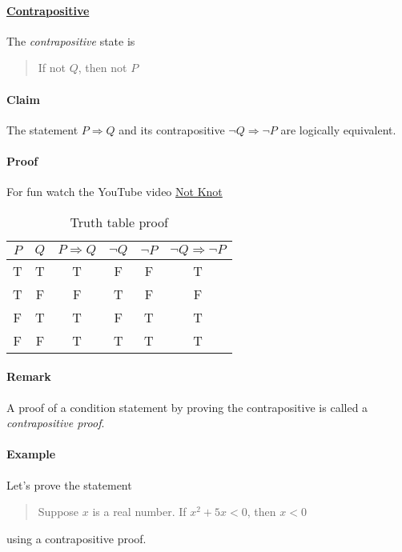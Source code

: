 \documentclass[../main.tex]{subfiles}
\begin{document}
\paragraph{\underline{Contrapositive}}

The \emph{contrapositive} state is

\begin{quote}
    If not $Q$, then not $P$
\end{quote}

\paragraph{Claim}

The statement $P \Rightarrow Q$ and its contrapositive $\neg Q \Rightarrow \neg P$ are logically 
equivalent.

\paragraph{Proof}

For fun watch the YouTube video \href{https://youtu.be/QcLfb0PhfO0?si=ngcYSId-1LFhW5fA}{Not Knot}

\begin{table*}[h]
    \centering
    \begin{tabular}{c|c|c|c|c|c}
        $P$ & $Q$ & $P \Rightarrow Q$ & $\neg Q$ & $\neg P$ & $\neg Q \Rightarrow \neg P$ \\
        \hline
        T & T & T & F & F & T \\
        T & F & F & T & F & F \\
        F & T & T & F & T & T \\
        F & F & T & T & T & T
    \end{tabular}
    \caption{Truth table proof}
\end{table*}

\paragraph{Remark} 

A proof of a condition statement by proving the contrapositive is called a \emph{contrapositive proof}.

\paragraph{Example}

Let's prove the statement
\begin{quote}
    Suppose $x$ is a real number. If $x^2 + 5x < 0$, then $x <0$
\end{quote}
using a contrapositive proof.
\end{document}
